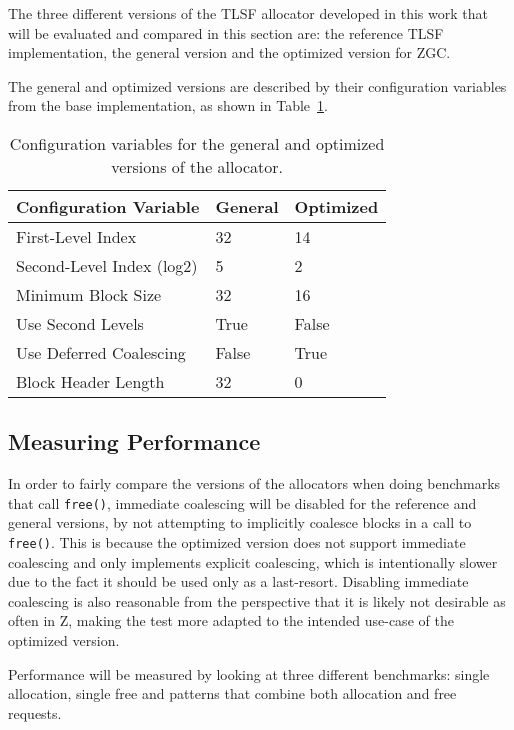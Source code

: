 The three different versions of the TLSF allocator developed in this work that will be evaluated and compared in this section are: the reference TLSF implementation, the general version and the optimized version for ZGC. 

The general and optimized versions are described by their configuration variables from the base implementation, as shown in Table~\ref{table:configuration-variables}.

\begin{table}[H]
\centering
\begin{tabular}{lllll}
\hline
Configuration Variable    & General  & \multicolumn{3}{l}{Optimized} \\ \hline
First-Level Index         & 32       & \multicolumn{3}{l}{14}        \\
Second-Level Index (log2) & 5        & \multicolumn{3}{l}{2}         \\
Minimum Block Size        & 32       & \multicolumn{3}{l}{16 }       \\
Use Second Levels         & True     & \multicolumn{3}{l}{False}     \\
Use Deferred Coalescing   & False    & \multicolumn{3}{l}{True}      \\
Block Header Length       & 32       & \multicolumn{3}{l}{0}        
\end{tabular}
\caption{Configuration variables for the general and optimized versions of the allocator.}
\label{table:configuration-variables}
\end{table}

\subsection{Measuring Performance}

In order to fairly compare the versions of the allocators when doing benchmarks that call \texttt{free()}, immediate coalescing will be disabled for the reference and general versions, by not attempting to implicitly coalesce blocks in a call to \texttt{free()}. This is because the optimized version does not support immediate coalescing and only implements explicit coalescing, which is intentionally slower due to the fact it should be used only as a last-resort. Disabling immediate coalescing is also reasonable from the perspective that it is likely not desirable as often in Z, making the test more adapted to the intended use-case of the optimized version.

Performance will be measured by looking at three different benchmarks: single allocation, single free and patterns that combine both allocation and free requests.

